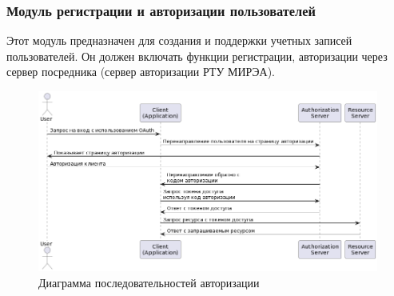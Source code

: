 \subsubsection{Модуль регистрации и авторизации пользователей}

Этот модуль предназначен для создания и поддержки учетных записей пользователей. Он должен включать функции регистрации, авторизации через сервер посредника (сервер авторизации РТУ МИРЭА).


\begin{figure}[htb]
	\centering
	\includegraphics[width=.9\textwidth]{images/registation-diagram.png}
	\parskip=6pt
	\caption{Диаграмма последовательностей авторизации}
	\label{fig:authDiagram}
\end{figure}

